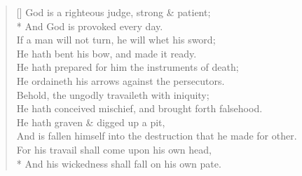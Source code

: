 \documentclass[MAIN]{subfiles}
\begin{document}
\settowidth{\versewidth}{If a man will not turn, he will whet his sword;}
\begin{verse}[\versewidth]
God is a righteous judge, strong \& patient;\\*
\vin And God is provoked every day.\\
If a man will not turn, he will whet his sword;\\
\vin He hath bent his bow, and made it ready.\\
He hath prepared for him the instruments of death;\\
\vin He ordaineth his arrows against the persecutors.\\
Behold, the ungodly travaileth with iniquity;\\
\vin He hath conceived mischief, and brought forth falsehood.\\
He hath graven \& digged up a pit,\\
\vin And is fallen himself into the destruction that he made for other.\\
For his travail shall come upon his own head,\\*
\vin And his wickedness shall fall on his own pate.
\end{verse}
\end{document}
